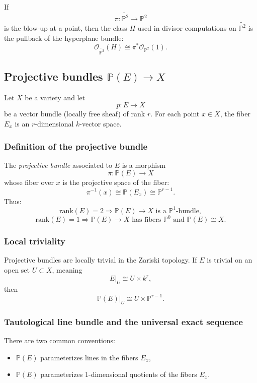 \documentclass[12pt,a4paper]{article}
\theoremstyle{plain}
\theoremstyle{definition}      %
\begin{document}
If
\[
\pi:\widetilde{\mathbb P^2}\to \mathbb P^2
\]
is the blow-up at a point, then the class $H$ used in divisor computations on $\widetilde{\mathbb P^2}$ is the pullback of the hyperplane bundle:
\[
\mathcal O_{\widetilde{\mathbb P^2}}(H)\cong \pi^{*}\mathcal O_{\mathbb P^2}(1).
\]

\subsection*{Projective bundles $\mathbb P(E)\to X$}

Let $X$ be a variety and let
\[
p:E\to X
\]
be a vector bundle (locally free sheaf) of rank $r$.
For each point $x\in X$, the fiber $E_x$ is an $r$-dimensional $k$-vector space.

\subsubsection*{Definition of the projective bundle}

The \emph{projective bundle} associated to $E$ is a morphism
\[
\pi:\mathbb P(E)\to X
\]
whose fiber over $x$ is the projective space of the fiber:
\[
\pi^{-1}(x)\cong \mathbb P(E_x)\cong \mathbb P^{r-1}.
\]
Thus:
\[
\mathrm{rank}(E)=2 \Longrightarrow \mathbb P(E)\to X \text{ is a } \mathbb P^1\text{-bundle},
\]
\[
\mathrm{rank}(E)=1 \Longrightarrow \mathbb P(E)\to X \text{ has fibers } \mathbb P^0 \text{ and } \mathbb P(E)\cong X.
\]

\subsubsection*{Local triviality}

Projective bundles are locally trivial in the Zariski topology.
If $E$ is trivial on an open set $U\subset X$, meaning
\[
E|_{U}\cong U\times k^{r},
\]
then
\[
\mathbb P(E)|_{U}\cong U\times \mathbb P^{r-1}.
\]

\subsubsection*{Tautological line bundle and the universal exact sequence}

There are two common conventions:
\begin{itemize}
	\item $\mathbb P(E)$ parameterizes lines in the fibers $E_x$,
	\item $\mathbb P(E)$ parameterizes $1$-dimensional quotients of the fibers $E_x$.
\end{itemize}
\end{document}
